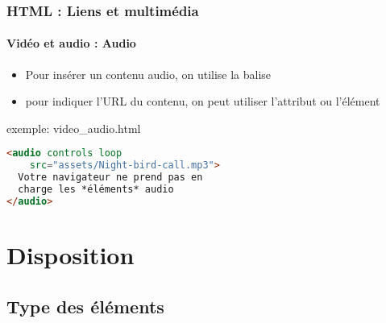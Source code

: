\documentclass[xcolor=table]{beamer}
\begin{document}
\begin{frame}[fragile]
\frametitle{HTML : Liens et multimédia}
\framesubtitle{Vidéo et audio : Audio}

\begin{minipage}{0.50\textwidth} 
	\begin{itemize}
		\item Pour insérer un contenu audio, on utilise la balise 
		\item pour indiquer l'URL du contenu, on peut utiliser l'attribut  ou l'élément 
	\end{itemize}
\end{minipage}
%
\begin{minipage}{0.49\textwidth}
\begin{exampleblock}{exemple: video\_audio.html}
\lstset{escapeinside=**}
\scriptsize\bfseries\vspace{-6pt}
\begin{lstlisting}[language={html}]
<audio controls loop 
    src="assets/Night-bird-call.mp3">
  Votre navigateur ne prend pas en 
  charge les *éléments* audio
</audio>
\end{lstlisting}\vspace{-6pt}
\end{exampleblock}
\end{minipage}

\end{frame}

\section{Disposition}

\subsection{Type des éléments}
\end{document}
